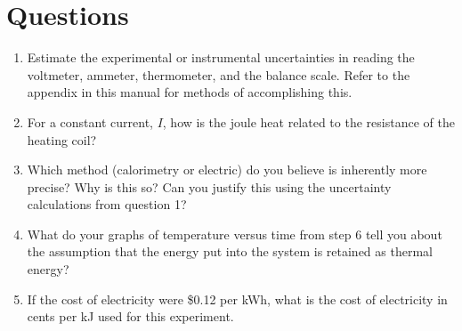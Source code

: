 
\section{Questions}
\begin{enumerate}
	\item Estimate the experimental or instrumental uncertainties 
in reading the voltmeter, ammeter, thermometer, and the balance scale.  Refer to the appendix in this manual for methods of accomplishing this. 
	\item For a constant current, $I$, how is the joule heat related to the resistance of the heating coil?
	\item Which method (calorimetry or electric) do you believe is inherently more precise?  Why is this so?  Can you justify this using the uncertainty calculations from question 1?
	\item What do your graphs of temperature versus time from step 6 tell you about the assumption that the energy put into the system is retained as thermal energy?
	\item If the cost of electricity were \$0.12 per kWh, what is the cost of electricity in cents per kJ used for this experiment. %
\end{enumerate}

